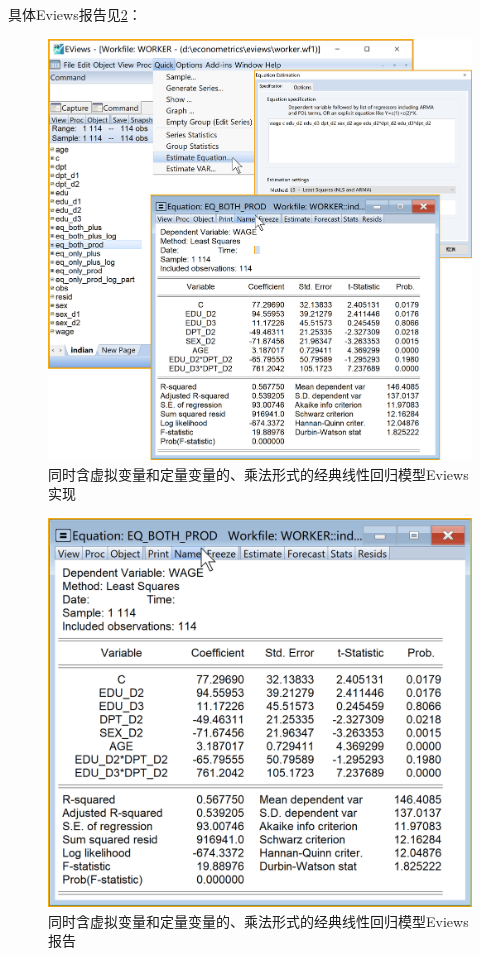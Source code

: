 \documentclass[12pt,(landscape,a4paper),(portrait,a4paper)]{article}
\theoremstyle{definition}
\theoremstyle{definition}
\theoremstyle{definition}
\theoremstyle{remark}
\begin{document}
具体Eviews报告见\ref{fig:both-prod-report}：

\begin{figure}

{\centering \includegraphics[width=27.15in]{picture/lab8-dummy-model/3-both-prod} 

}

\caption{同时含虚拟变量和定量变量的、乘法形式的经典线性回归模型Eviews实现}\label{fig:both-prod}
\end{figure}

\begin{figure}

{\centering \includegraphics[width=18.53in]{picture/lab8-dummy-model/3-both-prod-report} 

}

\caption{同时含虚拟变量和定量变量的、乘法形式的经典线性回归模型Eviews报告}\label{fig:both-prod-report}
\end{figure}
\end{document}
